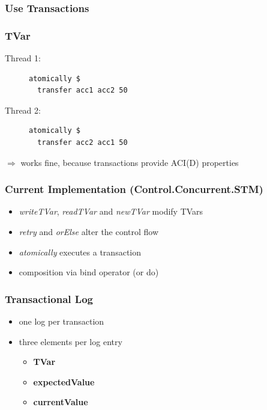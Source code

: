 \documentclass{beamer}
\newcommand{\code}[1]{\textbf{#1}}
\begin{document}
  \begin{frame}
    \frametitle{Use Transactions}
       
  \end{frame}
  
  \begin{frame}[fragile]
    \frametitle{TVar}
    \fboxsep=0pt
    \noindent
    \begin{minipage}[t]{0.48\linewidth}
      Thread 1:
      \begin{figure}
       \begin{lstlisting}[frame=single]
atomically $ 
  transfer acc1 acc2 50
       \end{lstlisting}
      \end{figure}
    \end{minipage}%
    \hfill%
    \begin{minipage}[t]{0.48\linewidth}
      Thread 2:
      \begin{figure}
       \begin{lstlisting}[frame=single]
atomically $ 
  transfer acc2 acc1 50
       \end{lstlisting}
      \end{figure}
    \end{minipage}
    \vfill
    \pause
    $\Rightarrow$ works fine, because transactions provide ACI(D) properties
\end{frame}
  \begin{frame}
    \frametitle{Current Implementation (Control.Concurrent.STM)}
    \begin{itemize}\setlength\itemsep{1em}
      \item \textit{writeTVar}, \textit{readTVar} and \textit{newTVar} modify TVars
      \item \textit{retry} and \textit{orElse} alter the control flow
      \item \textit{atomically} executes a transaction 
      \item composition via bind operator (or do)
    \end{itemize}
  \end{frame}
  
  \begin{frame}
   \frametitle{Transactional Log}
   \begin{itemize}\setlength\itemsep{1em}
    \item one log per transaction
    \item three elements per log entry
          \begin{itemize}
           \item \code{TVar}
           \item \code{expectedValue}
           \item \code{currentValue}
          \end{itemize}
   \end{itemize}
  \end{frame}
  
\end{document}
